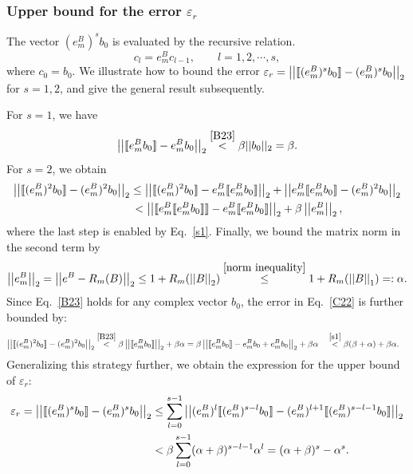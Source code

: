 \subsubsection{Upper bound for the error $\varepsilon_r$}
\label{Upper bound of }
The vector $(e^B_m)^sb_0 $ is evaluated by the recursive relation.
\begin{equation}
\label{recursive relation2}
    c_l=e^B_m c_{l-1},\qquad l=1,2,\cdots,s,
\end{equation}
where $c_0=b_0$. 
We illustrate how to bound the error $\varepsilon_r=\left|\left|\llbracket (e^B_m)^sb_0\rrbracket-(e^B_m)^sb_0 \right|\right|_2$ for $s=1,2$, and give the general result subsequently. 

For $s=1$, we have 
\begin{equation}
\label{s1}
    \left|\left|\llbracket e^B_mb_0\rrbracket-e^B_mb_0 \right|\right|_2\overset{\eqref{B23}}{<}\beta||b_0||_2=\beta.
\end{equation}
For $s=2$, we obtain
\begin{align}
\label{C22}
\nonumber    \left|\left|\llbracket (e^B_m)^2b_0\rrbracket-(e^B_m)^2b_0 \right|\right|_2 &\leq\left|\left|\llbracket (e^B_m)^2b_0\rrbracket-     
    e^B_m\llbracket e^B_mb_0\rrbracket\right|\right|_2+\left|\left|e^B_m\llbracket e^B_mb_0\rrbracket-(e^B_m)^2b_0\right|\right|_2\\
   &\, <\left|\left|\llbracket e^B_m \llbracket e^B_mb_0\rrbracket\rrbracket-     
    e^B_m\llbracket e^B_mb_0\rrbracket\right|\right|_2+\beta\left|\left|e^B_m\right|\right|_2,
\end{align} 
where the last step is enabled by Eq.\ \eqref{s1}.
Finally, we bound the matrix norm in the second term by
\begin{equation}
    \left|\left|e^B_m\right|\right|_2=\left|\left|e^B-R_m(B)\right|\right|_2\leq 1+R_m(\left|\left|B\right|\right|_2)\overset{\eqref{norm inequality}}{\leq} 1+R_m(\left|\left|B\right|\right|_1)=:\alpha.
\end{equation}
Since Eq.\ \eqref{B23} holds for any complex vector $b_0$, the error in Eq.\ \eqref{C22} is further bounded by:
\begin{align}
    \left|\left|\llbracket (e^B_m)^2b_0\rrbracket-(e^B_m)^2b_0 \right|\right|_2\overset{\eqref{B23}}{<}\beta\left|\left|\llbracket e^B_mb_0\rrbracket\right|\right|_2+\beta\alpha &=\beta\left|\left|\llbracket e^B_mb_0\rrbracket-e^B_mb_0+e^B_mb_0\right|\right|_2+\beta\alpha\quad \overset{\eqref{s1}}{<}\beta(\beta+\alpha)+\beta\alpha.
\end{align}
Generalizing this strategy further, we obtain the expression for the upper bound of $\varepsilon_r$: 
\begin{align}
\label{rouding}
\nonumber    \varepsilon_r=\left|\left|\llbracket (e^B_m)^sb_0\rrbracket-(e^B_m)^sb_0 \right|\right|_2 &\leq \sum_{l=0}^{s-1}\left|\left|(e^B_m)^l \llbracket (e^B_m)^{s-l}b_0\rrbracket-(e^B_m)^{l+1}\llbracket (e^B_m)^{s-l-1}b_0\rrbracket\right|\right|_2\\
    &<\beta\sum_{l=0}^{s-1}(\alpha+\beta)^{s-l-1}\alpha^{l}=(\alpha+\beta)^s-\alpha^s.
\end{align}    

